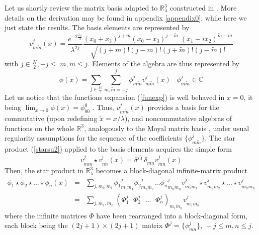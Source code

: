 \documentclass[a4paper,11pt]{article}
\numberwithin{equation}{section}
\newcommand{\be}{\begin{equation}}
\newcommand{\ee}{\end{equation}}
\def\beqa{\begin{eqnarray}}
\def\eeqa{\end{eqnarray}}
\def\nn{\nonumber}
\newcommand{\eqn}[1]{(\ref{#1})}
\newcommand\Rl{\mathbb{R}^3_\lambda}
\newcommand\gR{{\mathbb R}}
\def\gC{{\mathbb C}}
\def\gR{{\mathbb R}}
\def\N{{\mathbb N}}
\theoremstyle{nonumberplain}
\begin{document}
Let us shortly review  the matrix basis adapted to $\Rl$ constructed in \cite{vit-wal-12, duflo}. More details on the derivation may be found in appendix \ref{appendix0}, while here we just state the results. 
The basis elements are represented by 
\begin{equation}
v^j_{m\tilde m}(x)= \frac{ e^{-2\frac{ x_0}{\lambda}}}{ \lambda^{2j}}  \frac{(x_0+x_3)^{j+m}
(x_0-x_3)^{j-\tilde m}\; (x_1-i x_2)^{\tilde m -m}
}{\sqrt{(j+m)!(j-m)! (j+\tilde m)!(j-\tilde m)! }} \label{xmatrixbasis}
\end{equation}
with $j\in\frac{N}{2},  -j\le\;m,\tilde m\le j$.
Elements of the algebra are thus represented by
\be\phi(x)=\sum_{j\in \frac{\N}{2}}\sum_{m,\tilde m=-j}^j \phi^j_{m\tilde m} v^j_{m\tilde m}(x)  \;\;\; \phi^j_{m\tilde m}\in \gC\label{funexp}
\ee
Let us notice that the functions expansion \eqn{funexp} is well behaved in $x=0$, it being $\lim_{x\rightarrow 0}\phi(x) = \phi^0_{00}$ .  Thus,  $v^{j}_{m\tilde m}(x)$ provides a basis for the commutative (upon redefining $\tilde x= x/\lambda$), and noncommutative algebras of functions on the whole $\gR^3$, analogously to the Moyal matrix basis \cite{pepejoe},  under usual regularity assumptions for  the sequence of the coefficients $\{\phi^j_{m\tilde m}\}$.
The star product \eqn{starsu2} applied to the basis elements acquires the simple form
\be
v^j_{m\tilde m}\star v^{\tilde\jmath}_{n \tilde n}(x)=\delta^{j \tilde\jmath}\delta_{\tilde m
n}v^j_{m \tilde n}(x) \label{matrixprod}
\ee
Then, the star product in $\mathbb{R}_\lambda^3$ becomes a block-diagonal infinite-matrix product
\beqa
{\phi_1\star \phi_2}\star...\star\phi_n(x)&=&\sum_{j,m_i, \tilde m_i}{ \phi_1}^{j}_{m_1\tilde m_1} {\phi_2}^{j}_{m_2\tilde m_2}...{\phi_n}^j_{m_n\tilde m_n}
v^{j}_{m_1\tilde m_1} \star v^{j}_{m_2\tilde m_2}\star...\star v^{j}_{m_n\tilde m_n} \; \nn\\
&=& {\sum_{j,m_1, \tilde m_n} (\Phi_1^j\cdot \Phi_2^j\cdot...\cdot\Phi_n^j)_{m_1 \tilde m_n} v^j_{m_1 \tilde m_n}} \label{starprodtr}
\eeqa
 where the infinite matrices $\Phi$ have been rearranged into a block-diagonal form, each block being the $(2j+1)\times (2j+1)$ matrix   {$\Phi^j=\{\phi^j_{mn}\}, \, -j\le m,n\le j$}.
\end{document}
